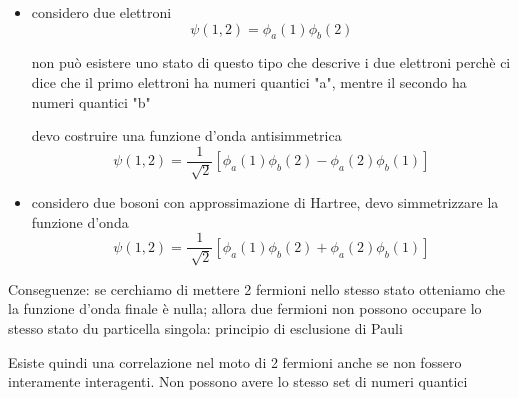 \begin{itemize}
    \item considero due elettroni
    \begin{equation*}
        \psi(1,2) = \phi_a(1)\phi_b(2)
    \end{equation*}
    
    \noindent non può esistere uno stato di questo tipo che descrive i due elettroni perchè ci dice che il primo elettroni ha numeri quantici "a", mentre il secondo ha numeri quantici "b" 
    
    \noindent devo costruire una funzione d'onda antisimmetrica 
    \begin{equation*}
        \psi(1,2) = \frac{1}{\sqrt[]{2}}[\phi_a(1)\phi_b(2) - \phi_a(2)\phi_b(1) ]
    \end{equation*}

    \item considero due bosoni con approssimazione di Hartree, devo simmetrizzare la funzione d'onda 
        \begin{equation*}
            \psi(1,2) = \frac{1}{\sqrt[]{2}} [\phi_a(1)\phi_b(2) + \phi_a(2)\phi_b(1)]
        \end{equation*}
\end{itemize} 

\noindent Conseguenze: \newline
se cerchiamo di mettere 2 fermioni nello stesso stato otteniamo che la funzione d'onda finale è nulla; allora due fermioni non possono occupare lo stesso stato du particella singola: principio di esclusione di Pauli

\noindent Esiste quindi una correlazione nel moto di 2 fermioni anche se non fossero interamente interagenti. Non possono avere lo stesso set di numeri quantici

    